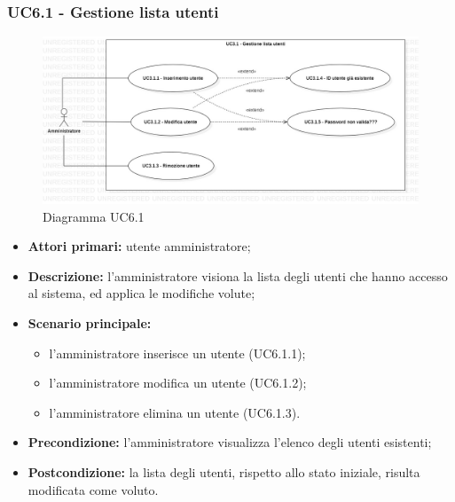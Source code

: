 \subsubsection{UC6.1 - Gestione lista utenti}
	\begin{center}
		\begin{figure}[h!]
			\includegraphics[width=15cm]{images/uc3.1.jpg}
			\caption{Diagramma UC6.1}
		\end{figure}
	\end{center}
	\begin{itemize}
		\item \textbf{Attori primari:} utente amministratore;
		\item \textbf{Descrizione:} l'amministratore visiona la lista degli utenti che hanno accesso al sistema, ed applica le modifiche volute;
		\item \textbf{Scenario principale:} 
			\begin{itemize}
				\item l'amministratore inserisce un utente (UC6.1.1);
				\item l'amministratore modifica un utente (UC6.1.2);
				\item l'amministratore elimina un utente (UC6.1.3).
			\end{itemize}
		\item \textbf{Precondizione:} l'amministratore visualizza l'elenco degli utenti esistenti;
		\item \textbf{Postcondizione:} la lista degli utenti, rispetto allo stato iniziale, risulta modificata come voluto.
	\end{itemize}

